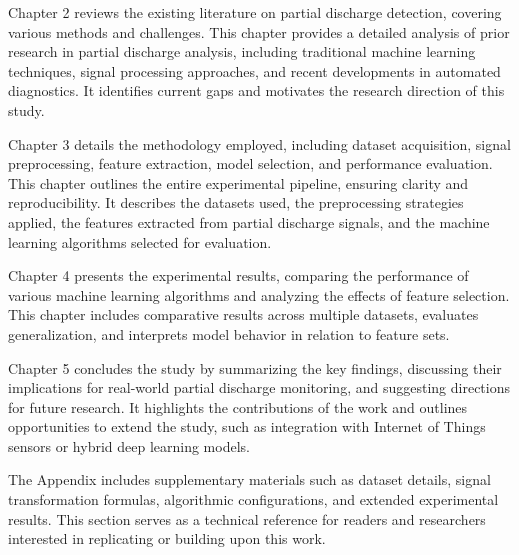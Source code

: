 Chapter 2 reviews the existing literature on partial discharge detection, covering various methods and challenges. This chapter provides a detailed analysis of prior research in partial discharge analysis, including traditional machine learning techniques, signal processing approaches, and recent developments in automated diagnostics. It identifies current gaps and motivates the research direction of this study.

Chapter 3 details the methodology employed, including dataset acquisition, signal preprocessing, feature extraction, model selection, and performance evaluation. This chapter outlines the entire experimental pipeline, ensuring clarity and reproducibility. It describes the datasets used, the preprocessing strategies applied, the features extracted from partial discharge signals, and the machine learning algorithms selected for evaluation.

Chapter 4 presents the experimental results, comparing the performance of various machine learning algorithms and analyzing the effects of feature selection. This chapter includes comparative results across multiple datasets, evaluates generalization, and interprets model behavior in relation to feature sets.

Chapter 5 concludes the study by summarizing the key findings, discussing their implications for real-world partial discharge monitoring, and suggesting directions for future research. It highlights the contributions of the work and outlines opportunities to extend the study, such as integration with Internet of Things sensors or hybrid deep learning models.

The Appendix includes supplementary materials such as dataset details, signal transformation formulas, algorithmic configurations, and extended experimental results. This section serves as a technical reference for readers and researchers interested in replicating or building upon this work.

